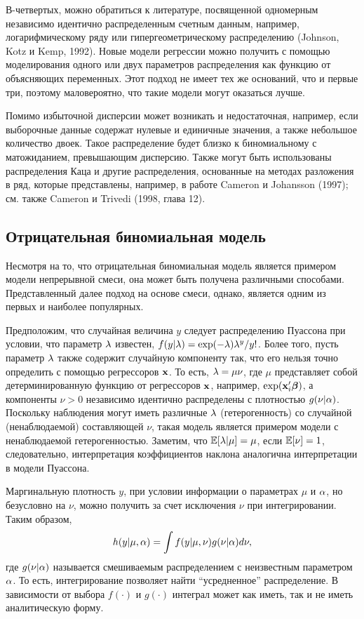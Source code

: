 В-четвертых, можно обратиться к литературе, посвященной одномерным независимо идентично распределенным счетным данным, например, логарифмическому ряду или гипергеометрическому распределению (Johnson, Kotz и Kemp, 1992). Новые модели регрессии можно получить с помощью моделирования одного или двух параметров распределения как функцию от объясняющих переменных. Этот подход не имеет тех же оснований, что и первые три, поэтому маловероятно, что такие модели могут оказаться лучше.

Помимо избыточной дисперсии может возникать и недостаточная, например, если выборочные данные содержат нулевые и единичные значения, а также небольшое количество двоек. Такое распределение будет близко к биномиальному с матожиданием, превышающим дисперсию. Также могут быть использованы распределения Каца и другие распределения, основанные на методах разложения в ряд, которые представлены, например, в работе Cameron и Johansson (1997); см. также Cameron и Trivedi (1998, глава 12).


\subsection{Отрицательная биномиальная модель}\label{sec:20.4.1}

\noindent
Несмотря на то, что отрицательная биномиальная модель является примером модели непрерывной смеси, она может быть получена различными способами. Представленный далее подход на основе смеси, однако, является одним из первых и наиболее популярных.

Предположим, что случайная величина $y$ следует распределению Пуассона при условии, что параметр $\lambda$ известен, $f(y|\lambda) = \exp(-\lambda)\lambda^y/y!$. Более того, пусть параметр $\lambda$ также содержит случайную компоненту так, что его нельзя точно определить с помощью регрессоров $\mathbf{x}$. То есть, $\lambda = \mu\nu$, где $\mu$ представляет собой детерминированную функцию от регрессоров $\mathbf{x}$, например, $\exp(\mathbf{x}_i'\bm{\beta})$, а компоненты $\nu > 0$ независимо идентично распределены с плотностью $g(\nu|\alpha)$. Поскольку наблюдения могут иметь различные $\lambda$ (гетерогенность) со случайной (ненаблюдаемой) составляющей $\nu$, такая модель является примером модели с ненаблюдаемой гетерогенностью. Заметим, что $\mathbb{E}[\lambda|\mu] = \mu$, если $\mathbb{E}[\nu] = 1$, следовательно, интерпретация коэффициентов наклона аналогична интерпретации в модели Пуассона.

Маргинальную плотность $y$, при условии информации о параметрах $\mu$ и $\alpha$, но безусловно на $\nu$, можно получить за счет исключения $\nu$ при интегрировании. Таким образом,
    \begin{align}\label{eq:20.11}
    h(y|\mu,\alpha) = \int f(y|\mu, \nu) g(\nu|\alpha) d\nu,
    \end{align}
где $g(\nu|\alpha)$ называется смешиваемым распределением с неизвестным параметром $\alpha$. То есть, интегрирование позволяет найти ``усредненное'' распределение. В зависимости от выбора $f(\cdot)$ и $g(\cdot)$ интеграл может как иметь, так и не иметь аналитическую форму.

